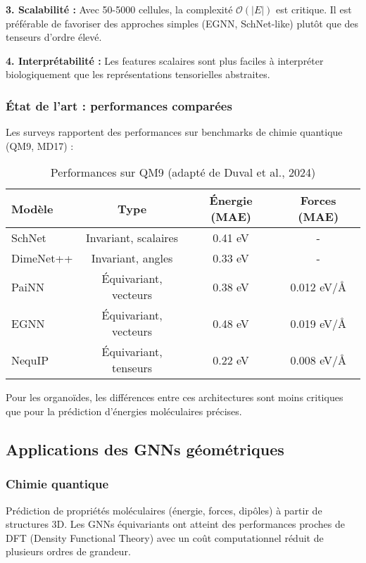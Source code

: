 \textbf{3. Scalabilité :}
Avec 50-5000 cellules, la complexité $\mathcal{O}(|E|)$ est critique. Il est préférable de favoriser des approches simples (EGNN, SchNet-like) plutôt que des tenseurs d'ordre élevé.

\textbf{4. Interprétabilité :}
Les features scalaires sont plus faciles à interpréter biologiquement que les représentations tensorielles abstraites.

\subsubsection{État de l'art : performances comparées}

Les surveys rapportent des performances sur benchmarks de chimie quantique (QM9, MD17) :

\begin{table}[h]
\centering
\small
\begin{tabular}{lccc}
\hline
\textbf{Modèle} & \textbf{Type} & \textbf{Énergie (MAE)} & \textbf{Forces (MAE)} \\
\hline
SchNet & Invariant, scalaires & 0.41 eV & - \\
DimeNet++ & Invariant, angles & 0.33 eV & - \\
PaiNN & Équivariant, vecteurs & 0.38 eV & 0.012 eV/Å \\
EGNN & Équivariant, vecteurs & 0.48 eV & 0.019 eV/Å \\
NequIP & Équivariant, tenseurs & 0.22 eV & 0.008 eV/Å \\
\hline
\end{tabular}
\caption{Performances sur QM9 (adapté de Duval et al., 2024)}
\end{table}

Pour les organoïdes, les différences entre ces architectures sont moins critiques que pour la prédiction d'énergies moléculaires précises.

\subsection{Applications des GNNs géométriques}

\subsubsection{Chimie quantique}

Prédiction de propriétés moléculaires (énergie, forces, dipôles) à partir de structures 3D. Les GNNs équivariants ont atteint des performances proches de DFT (Density Functional Theory) avec un coût computationnel réduit de plusieurs ordres de grandeur.

